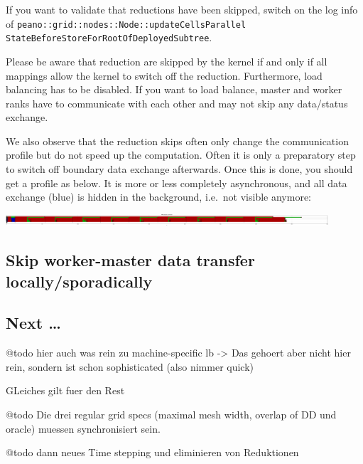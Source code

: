 \begin{remark}
  If you want to validate that reductions have been skipped, switch on the log
  info of 
  \texttt{peano::grid::nodes::Node::updateCellsParallel}
  \texttt{StateBeforeStoreForRootOfDeployedSubtree}.
\end{remark}


\noindent
Please be aware that reduction are skipped by the kernel if and only if all
mappings allow the kernel to switch off the reduction.
Furthermore, load balancing has to be disabled.
If you want to load balance, master and worker ranks have to communicate with
each other and may not skip any data/status exchange.

We also observe that the reduction skips often only change the communication
profile but do not speed up the computation. 
Often it is only a preparatory step to switch off boundary data exchange
afterwards.
Once this is done, you should get a profile as below. 
It is more or less completely asynchronous, and all data exchange (blue) is
hidden in the background, i.e.~not visible anymore:


\begin{center}
  \includegraphics[width=0.9\textwidth]{63_mpi-synchronisation/mpi-phases-after.pdf}
\end{center}





\subsection{Skip worker-master data transfer locally/sporadically}


\subsection{Next \ldots}




@todo hier auch was rein zu machine-specific lb -> Das gehoert aber nicht hier
rein, sondern ist schon sophisticated (also nimmer quick)

GLeiches gilt fuer den Rest

@todo Die drei regular grid specs (maximal mesh width, overlap of DD und oracle)
muessen synchronisiert sein.

@todo dann neues Time stepping und eliminieren von Reduktionen

